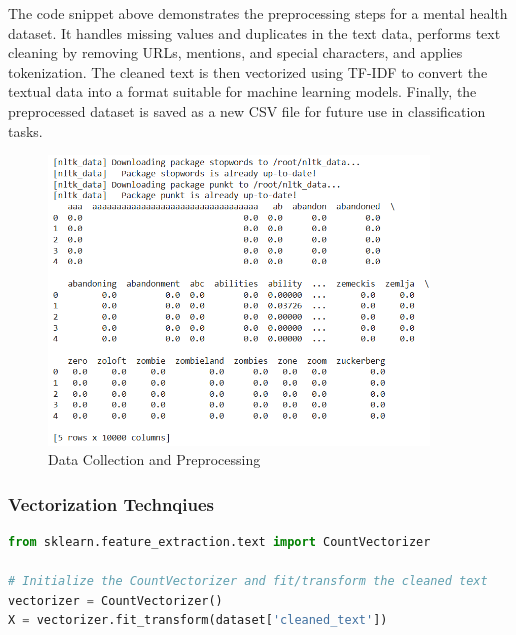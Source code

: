 \noindent
The code snippet above demonstrates the preprocessing steps for a mental health dataset. It handles missing values and duplicates in the text data, performs text cleaning by removing URLs, mentions, and special characters, and applies tokenization. The cleaned text is then vectorized using TF-IDF to convert the textual data into a format suitable for machine learning models. Finally, the preprocessed dataset is saved as a new CSV file for future use in classification tasks.

\begin{figure}[h!]  
    \centering
    \includegraphics[width=0.9\textwidth]{Images/Data Cleaning and Preprocessing.png}  
    \caption{Data Collection and Preprocessing}
    \label{Data Collection and Preprocessing}  %
\end{figure}


\subsubsection{Vectorization Technqiues}

\begin{tcolorbox}[colback=gray!5!white, colframe=gray!80!black, boxrule=0.5pt, title=Bag of Words]
\begin{lstlisting}[language=Python]
from sklearn.feature_extraction.text import CountVectorizer

# Initialize the CountVectorizer and fit/transform the cleaned text
vectorizer = CountVectorizer()
X = vectorizer.fit_transform(dataset['cleaned_text'])
\end{lstlisting}
\end{tcolorbox}

